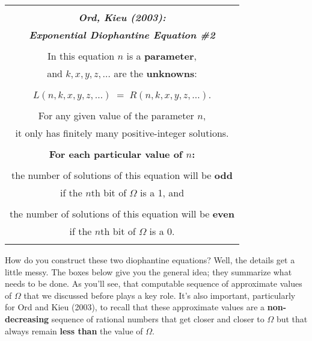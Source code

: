 \documentclass[12pt]{book}
\begin{document}
\begin{center}
\begin{tabular}{|c|}
\hline
\\
\textbf{\large \emph{Ord, Kieu (2003):}}
\\
\textbf{\large \emph{Exponential Diophantine Equation \#2}}
\\ \\
In this equation $n$ is a \textbf{parameter}, 
\\
and $k, x, y, z, \ldots$ are the \textbf{unknowns}:
\\ \\
$L(n, k, x, y, z, \ldots) \; = \; R(n, k, x, y, z, \ldots)$.
\\ \\
For any given value of the parameter $n$,
\\
it only has finitely many positive-integer solutions. 
\\ \\
\textbf{For each particular value of $n$:}
\\ \\
the number of solutions of this equation will be \textbf{odd}
\\
if the $n$th bit of $\Omega$ is a 1, and 
\\ \\
the number of solutions of this equation will be \textbf{even} 
\\
if the $n$th bit of $\Omega$ is a 0.
\\
\\
\hline
\end{tabular}
\end{center}
 
How do you construct these two diophantine equations?
Well, the details get a little messy. The boxes below give you
the general idea; they summarize what needs to be done.
As you'll see, that computable sequence of approximate values of $\Omega$
that we discussed before plays a key role.  It's also important, particularly
for Ord and Kieu (2003),
to recall that these approximate values are a \textbf{non-decreasing} sequence
of rational numbers that get closer and closer to $\Omega$ but that always
remain \textbf{less than} the value of $\Omega$.
 
\end{document}

